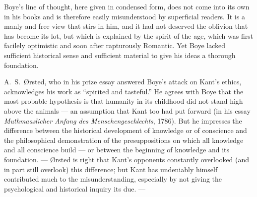 \documentclass[12pt,a4paper]{book}
\newcommand{\opage}[1]{\marginnote{\footnotesize\textit{[#1]}}}
\begin{document}
Boye's line of thought, here given in condensed form, does not come into its own in
his books and is therefore easily misunderstood by superficial readers. It is a
manly and free view that stirs in him, and it had not deserved the oblivion that has
become its lot, but which is explained by the spirit of the age, which was first
facilely optimistic and soon after rapturously Romantic. Yet Boye lacked sufficient
historical sense and sufficient material to give his ideas a thorough foundation.

A.\ S.\ Ørsted, who in his prize essay answered Boye's attack on Kant's ethics,
acknowledges his work as ``spirited and tasteful.'' He agrees with Boye that the
most probable hypothesis is that humanity in its childhood did not stand high above
the animals --- an assumption that Kant too had put forward (in his essay
\emph{Muthmaaslicher Anfang des Menschengeschlechts}, 1786). But he impresses the
difference between the historical development of knowledge or of conscience and the
philosophical demonstration of the presuppositions on which all knowledge and all
conscience \opage{35}build --- or between the beginning of knowledge and its foundation. ---
Ørsted is right that Kant's opponents constantly overlooked (and in part still
overlook) this difference; but Kant has undeniably himself contributed much to the
misunderstanding, especially by not giving the psychological and historical inquiry
its due. ---

\medskip
\end{document}
